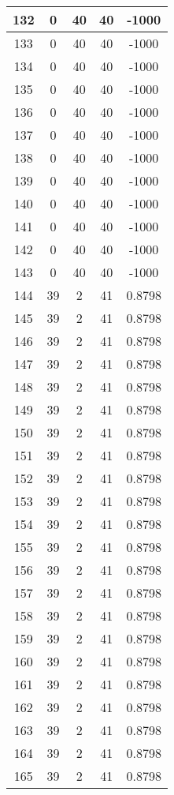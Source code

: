 \documentclass[letterpaper, 12pt]{article}
\begin{document}
\begin{longtable}{|c|c|c|c|c|}
\hline
132 & 0 & 40 & 40 & -1000 \\
\hline
133 & 0 & 40 & 40 & -1000 \\
\hline
134 & 0 & 40 & 40 & -1000 \\
\hline
135 & 0 & 40 & 40 & -1000 \\
\hline
136 & 0 & 40 & 40 & -1000 \\
\hline
137 & 0 & 40 & 40 & -1000 \\
\hline
138 & 0 & 40 & 40 & -1000 \\
\hline
139 & 0 & 40 & 40 & -1000 \\
\hline
140 & 0 & 40 & 40 & -1000 \\
\hline
141 & 0 & 40 & 40 & -1000 \\
\hline
142 & 0 & 40 & 40 & -1000 \\
\hline
143 & 0 & 40 & 40 & -1000 \\
\hline
144 & 39 & 2 & 41 & 0.8798 \\
\hline
145 & 39 & 2 & 41 & 0.8798 \\
\hline
146 & 39 & 2 & 41 & 0.8798 \\
\hline
147 & 39 & 2 & 41 & 0.8798 \\
\hline
148 & 39 & 2 & 41 & 0.8798 \\
\hline
149 & 39 & 2 & 41 & 0.8798 \\
\hline
150 & 39 & 2 & 41 & 0.8798 \\
\hline
151 & 39 & 2 & 41 & 0.8798 \\
\hline
152 & 39 & 2 & 41 & 0.8798 \\
\hline
153 & 39 & 2 & 41 & 0.8798 \\
\hline
154 & 39 & 2 & 41 & 0.8798 \\
\hline
155 & 39 & 2 & 41 & 0.8798 \\
\hline
156 & 39 & 2 & 41 & 0.8798 \\
\hline
157 & 39 & 2 & 41 & 0.8798 \\
\hline
158 & 39 & 2 & 41 & 0.8798 \\
\hline
159 & 39 & 2 & 41 & 0.8798 \\
\hline
160 & 39 & 2 & 41 & 0.8798 \\
\hline
161 & 39 & 2 & 41 & 0.8798 \\
\hline
162 & 39 & 2 & 41 & 0.8798 \\
\hline
163 & 39 & 2 & 41 & 0.8798 \\
\hline
164 & 39 & 2 & 41 & 0.8798 \\
\hline
165 & 39 & 2 & 41 & 0.8798 \\

\end{longtable}
\end{document}
